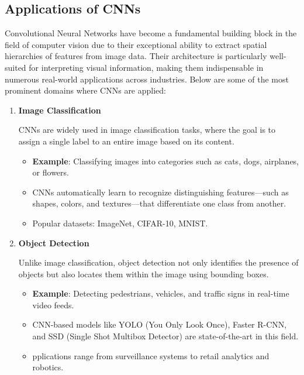 \subsection{Applications of CNNs}
Convolutional Neural Networks have become a fundamental building block in the field of computer vision due to their exceptional ability to extract spatial hierarchies of features from image data. Their architecture is particularly well-suited for interpreting visual information, making them indispensable in numerous real-world applications across industries. Below are some of the most prominent domains where CNNs are applied:

\begin{enumerate}
    \item \textbf{Image Classification}
    
    CNNs are widely used in image classification tasks, where the goal is to assign a single label to an entire image based on its content.
    \begin{itemize}
    
        \item \textbf{Example}: Classifying images into categories such as cats, dogs, airplanes, or flowers.
        \item CNNs automatically learn to recognize distinguishing features—such as shapes, colors, and textures—that differentiate one class from another.
        \item Popular datasets: ImageNet, CIFAR-10, MNIST.
        
    \end{itemize}
    
    \item \textbf{Object Detection}
    
    Unlike image classification, object detection not only identifies the presence of objects but also locates them within the image using bounding boxes.
    
    \begin{itemize}
        \item \textbf{Example}: Detecting pedestrians, vehicles, and traffic signs in real-time video feeds.
        \item CNN-based models like YOLO (You Only Look Once), Faster R-CNN, and SSD (Single Shot Multibox Detector) are state-of-the-art in this field.
        \item pplications range from surveillance systems to retail analytics and robotics.





\end{itemize}
\end{enumerate}
